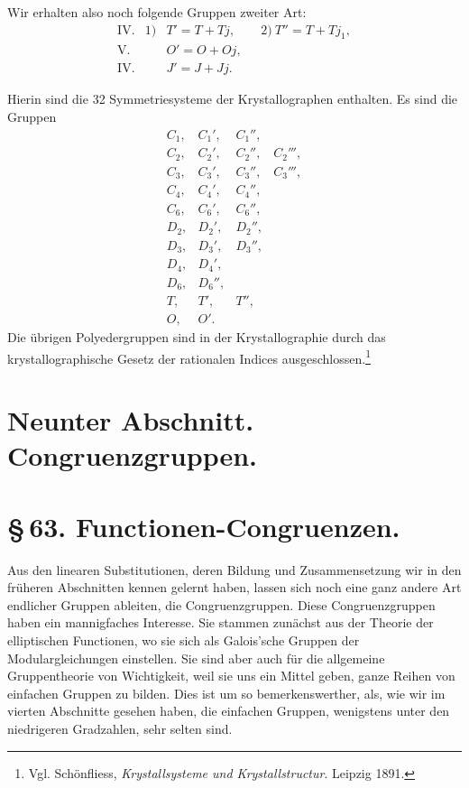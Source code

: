 \documentclass[11pt]{article}
\begin{document}
Wir erhalten also noch folgende Gruppen zweiter Art:
\[
\begin{array}{lll}
\mathrm{IV}.&1)&T'=T+Tj,\qquad 2)\ T''=T+Tj_1,\\
\mathrm{V}.&&O'=O+Oj,\\
\mathrm{IV}.&&J'=J+Jj.
\end{array}
\]

Hierin sind die 32 Symmetriesysteme der Krystallographen enthalten. Es sind die Gruppen
\[
\begin{array}{llll}
C_1,&C_1',&C_1'',\\
C_2,&C_2',&C_2'',&C_2''',\\
C_3,&C_3',&C_3'',&C_3''',\\
C_4,&C_4',&C_4'',\\
C_6,&C_6',&C_6'',\\[0.3em]
D_2,&D_2',&D_2'',\\
D_3,&D_3',&D_3'',\\
D_4,&D_4',\\
D_6,&D_6'',\\
T,&T',&T'',\\
O,&O'.
\end{array}
\]
Die übrigen Polyedergruppen sind in der Krystallographie durch das krystallographische Gesetz der rationalen Indices ausgeschlossen.\footnote{Vgl. Schönfliess, \emph{Krystallsysteme und Krystallstructur}. Leipzig 1891.}


\section*{Neunter Abschnitt. Congruenzgruppen.}

\section*{\S\,63. Functionen-Congruenzen.}

Aus den linearen Substitutionen, deren Bildung und Zusammensetzung wir in den früheren Abschnitten kennen gelernt haben, lassen sich noch eine ganz andere Art endlicher Gruppen ableiten, die Congruenzgruppen. Diese Congruenzgruppen haben ein mannigfaches Interesse. Sie stammen zunächst aus der Theorie der elliptischen Functionen, wo sie sich als Galois'sche Gruppen der Modulargleichungen einstellen. Sie sind aber auch für die allgemeine Gruppentheorie von Wichtigkeit, weil sie uns ein Mittel geben, ganze Reihen von einfachen Gruppen zu bilden. Dies ist um so bemerkenswerther, als, wie wir im vierten Abschnitte gesehen haben, die einfachen Gruppen, wenigstens unter den niedrigeren Gradzahlen, sehr selten sind.
\end{document}
